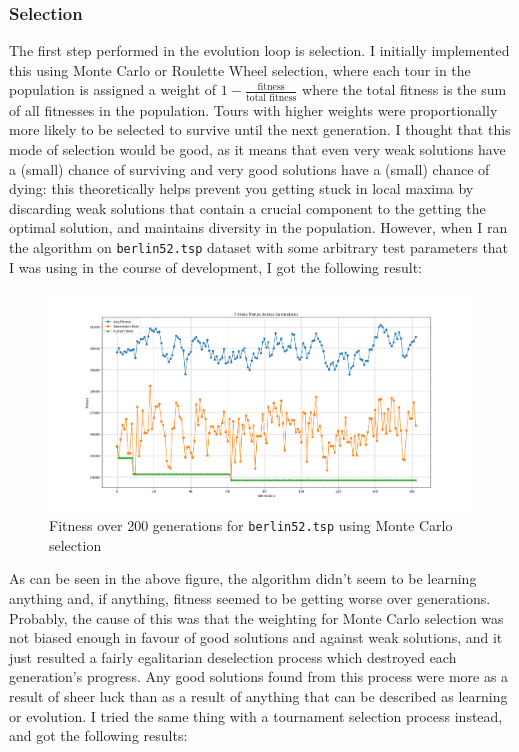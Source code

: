 \documentclass[a4paper]{article}
\begin{document}
\subsubsection{Selection}
The first step performed in the evolution loop is selection.
I initially implemented this using Monte Carlo or Roulette Wheel selection, where each tour in the population is assigned a weight of $1 - \frac{\text{fitness}}{\text{total fitness}}$ where the total fitness is the sum of all fitnesses in the population.
Tours with higher weights were proportionally more likely to be selected to survive until the next generation.
I thought that this mode of selection would be good, as it means that even very weak solutions have a (small) chance of surviving and very good solutions have a (small) chance of dying: this theoretically helps prevent you getting stuck in local maxima by discarding weak solutions that contain a crucial component to the getting the optimal solution, and maintains diversity in the population.
However, when I ran the algorithm on \verb|berlin52.tsp| dataset with some arbitrary test parameters that I was using in the course of development, I got the following result:

\begin{figure}[H]
    \centering
    \includegraphics[width=\textwidth]{./images/berlin52_monte_defaults.png}
    \caption{Fitness over 200 generations for \texttt{berlin52.tsp} using Monte Carlo selection }
\end{figure}

As can be seen in the above figure, the algorithm didn't seem to be learning anything and, if anything, fitness seemed to be getting worse over generations.
Probably, the cause of this was that the weighting for Monte Carlo selection was not biased enough in favour of good solutions and against weak solutions, and it just resulted a fairly egalitarian deselection process which destroyed each generation's progress.
Any good solutions found from this process were more as a result of sheer luck than as a result of anything that can be described as learning or evolution.
I tried the same thing with a tournament selection process instead, and got the following results:
\end{document}
